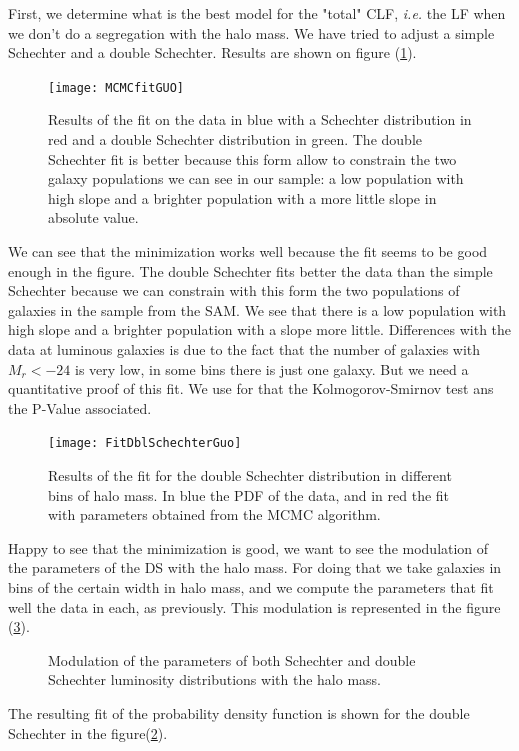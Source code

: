 First, we determine what is the best model for the "total" CLF, \textit{i.e.} the LF when we don't do a segregation with the halo
mass. We have tried to adjust a simple Schechter and a double Schechter. Results are shown on figure (\ref{fig:fitguo}).
\begin{figure}[ht]
	\centering
	\texttt{[image: MCMCfitGUO]}
	\caption{\footnotesize{}Results of the fit on the data in blue with a Schechter distribution in red and a double Schechter
	distribution in green. The double Schechter fit is better because this form allow to constrain the two galaxy populations we
	can see in our sample: a low population with high slope and a brighter population with a more little slope in absolute
	value.}
	\label{fig:fitguo}
\end{figure}
We can see that the minimization works well because the fit seems to be good enough in the figure. The double Schechter fits better
the data than the simple Schechter because we can constrain with this form the two populations of galaxies in the sample from the
\citet{Guo+11} SAM. We see that there is a low population with high slope and a brighter population with a slope more little.
Differences with the data at luminous galaxies is due to the fact that the number of galaxies with $M_r<-24$ is very low, in some
bins there is just one galaxy. But we need a quantitative proof of this fit. We use for that the Kolmogorov-Smirnov test ans the
P-Value associated.
\begin{figure}[ht]
	\centering
	\texttt{[image: FitDblSchechterGuo]}
	\caption{\footnotesize{}Results of the fit for the double Schechter distribution in different bins of halo mass. In blue the
	PDF of the data, and in red the fit with parameters obtained from the MCMC algorithm.}
	\label{fig:fitguodblsch}
\end{figure}

Happy to see that the minimization is good, we want to see the modulation of the parameters of the DS with the halo mass. For doing
that we take galaxies in bins of the certain width in halo mass, and we compute the parameters that fit well the data in each, as
previously. This modulation is represented in the figure (\ref{fig:modsch}).
\begin{figure}[p]
	\centering
	\begin{minipage}{\linewidth}
	\centering
	\end{minipage}
	\begin{minipage}{\linewidth}
	\centering
	\end{minipage}
	\caption{\footnotesize{}Modulation of the parameters of both Schechter and double Schechter luminosity distributions with
	the halo mass.}
	\label{fig:modsch}
\end{figure}
The resulting fit of the probability density function is shown for the double Schechter in the figure(\ref{fig:fitguodblsch}).

